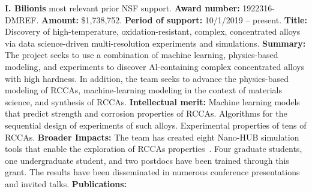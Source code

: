 








\textbf{I. Bilionis} most relevant prior NSF support. \textbf{Award number:} 1922316-DMREF. \textbf{Amount: } \$1,738,752. \textbf{Period of support:} 10/1/2019 -- present. \textbf{Title:} Discovery of high-temperature, oxidation-resistant, complex, concentrated alloys via data science-driven multi-resolution experiments and simulations. \textbf{Summary:} The project seeks to use a combination of machine learning, physics-based modeling, and experiments to discover Al-containing complex concentrated alloys with high hardness. In addition, the team seeks to advance the physics-based modeling of RCCAs, machine-learning modeling in the context of materials science, and synthesis of RCCAs. \textbf{Intellectual merit:} Machine learning models that predict strength and corrosion properties of RCCAs. Algorithms for the sequential design of experiments of such alloys. Experimental properties of tens of RCCAs.
\textbf{Broader Impacts:} The team has created eight Nano-HUB simulation tools that enable the exploration of RCCAs properties~\cite{35885,31736,33036,33792,36022,36148,35881}. Four graduate students, one undergraduate student, and two postdocs have been trained through this grant. The results have been disseminated in numerous conference presentations and invited talks. \textbf{Publications:} \cite{KARUMURI2023111851, FARACHE2022111386,10.1063/5.0076584,strachan2021,McClure2021} 



